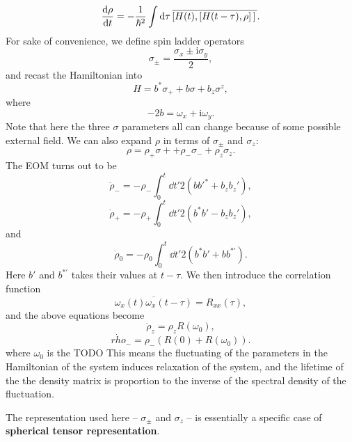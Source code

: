 \documentclass[hyperref, a4paper]{article}
\newcommand*{\ii}{\mathrm{i}}
\newcommand*{\concept}[1]{{\textbf{#1}}}
\begin{document}
\begin{equation}
    \dv{\rho}{t} = - \frac{1}{\hbar^2} \int \dd{\tau}
    \overline{
        \comm*{H(t)}{\comm*{H(t - \tau)}{\rho}}
    }.
\end{equation}
For sake of convenience, 
we define spin ladder operators 
\begin{equation}
    \sigma_{\pm} = \frac{\sigma_x \pm \ii \sigma_y}{2},
\end{equation}
and recast the Hamiltonian into  
\begin{equation}
    H = b^* \sigma_+ + b \sigma + b_z \sigma^z, 
\end{equation}
where 
\begin{equation}
    - 2 b = \omega_x + \ii \omega_y.
\end{equation}
Note that here the three $\sigma$ parameters all can change
because of some possible external field.
We can also expand $\rho$ in terms of $\sigma_\pm$ and $\sigma_z$: 
\begin{equation}
    \rho = \rho_+ \sigma+ + \rho_- \sigma_- + \rho_z \sigma_z.
\end{equation}
The EOM turns out to be 
\begin{equation}
    \dot{\rho}_- = - \rho_- \int_{0}^{t} \dd{t'} 2 (b b'^* + b_z b_z') , 
\end{equation}
\begin{equation}
    \dot{\rho}_+ = - \rho_+ \int_{0}^{t} \dd{t'} 2 (b^* b' - b_z b_z') , 
\end{equation}
and 
\begin{equation}
    \dot{\rho}_0 = - \rho_0 \int_{0}^{t} \dd{t'} 2 (b^* b' + b b^{*'}).
\end{equation}
Here $b'$ and $b^{*'}$ takes their values at $t - \tau$.
We then introduce the correlation function 
\begin{equation}
    \overline{\omega_x(t) \omega_{x} (t - \tau)} = R_{xx}(\tau),
\end{equation}
and the above equations become 
\begin{equation}
    \dot{\rho}_z = \rho_z R(\omega_0), 
\end{equation}
\begin{equation}
    \dot{rho}_- = \rho_- (R(0) + R(\omega_0)).
\end{equation}
where $\omega_0$ is the TODO 
This means the fluctuating of the parameters in the Hamiltonian of the system
induces relaxation of the system, 
and the lifetime of the the density matrix is proportion to the inverse of 
the spectral density of the fluctuation. 

The representation used here -- $\sigma_\pm$ and $\sigma_z$ -- 
is essentially a specific case of \concept{spherical tensor representation}.
\end{document}
